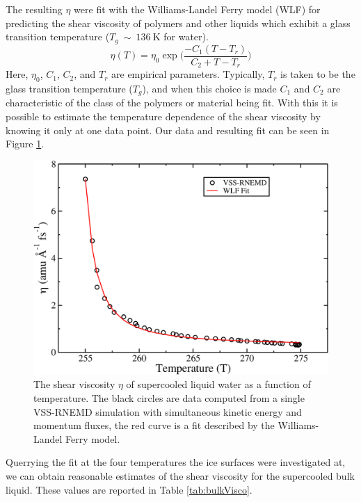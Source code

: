 The resulting $\eta$ were fit with the Williams-Landel Ferry model (WLF)
for predicting the shear viscosity of polymers and other liquids which
exhibit a glass transition temperature ($T_g~\sim~136~\mathrm{K}$ for
water). 
\begin{equation}\label{eq:WLF}
\eta (T) = \eta_0 \exp \Bigg({\frac{-C_1 (T-T_r)}{C_2 + T - T_r}}\Bigg)
\end{equation}
Here, $\eta_0$, $C_1$, $C_2$, and $T_r$ are empirical
parameters. Typically, $T_r$ is taken to be the glass transition
temperature ($T_g$), and when this choice is made $C_1$ and $C_2$ are
characteristic of the class of the polymers or material being
fit. With this it is possible to estimate the temperature dependence
of the shear viscosity by knowing it only at one data point. Our data
and resulting fit can be seen in Figure \ref{fig:etaT}.
\begin{figure}
\includegraphics[width=\linewidth]{Figures/etaT}
\caption{\label{fig:etaT} The shear viscosity $\eta$ of supercooled
  liquid water as a function of temperature. The black circles are
  data computed from a single VSS-RNEMD simulation with simultaneous
  kinetic energy and momentum fluxes, the red curve is a fit described
  by the Williams-Landel Ferry model.}
\end{figure} 
Querrying the fit at the four temperatures the ice surfaces were
investigated at, we can obtain reasonable estimates of the shear
viscosity for the supercooled bulk liquid. These values are reported
in Table \ref{tab:bulkVisco}.
   

